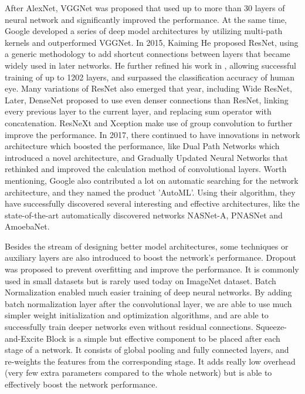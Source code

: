 After AlexNet, VGGNet\cite{simonyan2014very} was proposed that used up to more than 30 layers of neural network and significantly improved the performance. At the same time, Google developed a series of deep model architectures\cite{szegedy2015going,szegedy2016inception,szegedy2016rethinking} by utilizing multi-path kernels and outperformed VGGNet. In 2015, Kaiming He proposed ResNet\cite{he2016deep}, using a generic methodology to add shortcut connections between layers that became widely used in later networks. He further refined his work in \cite{he2016identity}, allowing successful training of up to 1202 layers, and surpassed the classification accuracy of human eye. Many variations of ResNet also emerged that year, including Wide ResNet, Later, DenseNet\cite{huang2017densely} proposed to use even denser connections than ResNet, linking every previous layer to the current layer, and replacing sum operator with concatenation. ResNeXt\cite{xie2017aggregated} and Xception\cite{chollet2016xception} make use of group convolution to further improve the performance. In 2017, there continued to have innovations in network architecture which boosted the performance, like Dual Path Networks\cite{chen2017dual} which introduced a novel architecture, and Gradually Updated Neural Networks\cite{qiao2017gradually} that rethinked and improved the calculation method of convolutional layers. Worth mentioning, Google also contributed a lot on automatic searching for the network architecture, and they named the product 'AutoML'. Using their algorithm, they have successfully discovered several interesting and effective architectures, like the state-of-the-art automatically discovered networks NASNet-A\cite{zoph2017learning}, PNASNet\cite{liu2017progressive} and AmoebaNet\cite{real2018regularized}.

Besides the stream of designing better model architectures, some techniques or auxiliary layers are also introduced to boost the network's performance. Dropout\cite{srivastava2014dropout} was proposed to prevent overfitting and improve the performance. It is commonly used in small datasets but is rarely used today on ImageNet dataset. Batch Normalization\cite{ioffe2015batch} enabled much easier training of deep neural networks. By adding batch normalization layer after the convolutional layer, we are able to use much simpler weight initialization and optimization algorithms, and are able to successfully train deeper networks even without residual connections\cite{he2016deep}. Squeeze-and-Excite Block\cite{hu2017squeeze} is a simple but effective component to be placed after each stage of a network. It consists of global pooling and fully connected layers, and re-weights the features from the corresponding stage. It adds really low overhead (very few extra parameters compared to the whole network) but is able to effectively boost the network performance.

